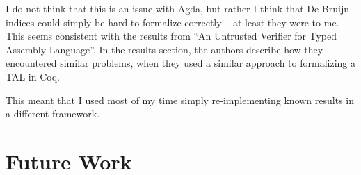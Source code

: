 I do not think that this is an issue with Agda, but rather I think that De
Bruijn indices could simply be hard to formalize correctly -- at least they were
to me. This seems consistent with the results from ``An Untrusted Verifier for
Typed Assembly Language''\cite{untrusted}. In the results section, the authors
describe how they encountered similar problems, when they used a similar
approach to formalizing a TAL in Coq.

This meant that I used most of my time simply re-implementing known results in a
different framework.

\section{Future Work}
